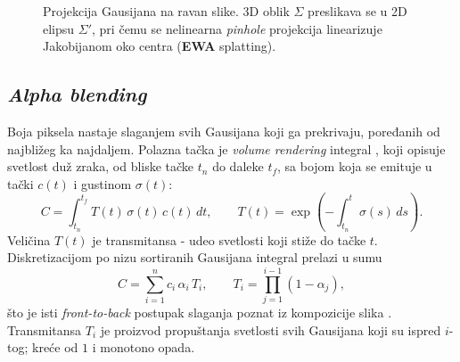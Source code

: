 \documentclass[12pt]{article}
\begin{document}
   \begin{figure}[H]
      \centering
      \vspace{1.2cm}
      \caption{Projekcija Gausijana na ravan slike. 3D oblik $\Sigma$ preslikava se
      u 2D elipsu $\Sigma'$, pri čemu se nelinearna \textit{pinhole} projekcija
      linearizuje Jakobijanom oko centra (\textbf{EWA} splatting).}
      \label{fig:proj}
   \end{figure}

   \newpage
   \subsection{\textit{Alpha blending}}

   Boja piksela nastaje slaganjem svih Gausijana koji ga prekrivaju, poređanih od
   najbližeg ka najdaljem. Polazna tačka je \textit{volume rendering} integral
   \cite{max_volume_rendering}, koji opisuje svetlost duž zraka, od bliske tačke
   $t_n$ do daleke $t_f$, sa bojom koja se emituje u tački $c(t)$ i gustinom $\sigma(t)$:
   \begin{equation}\label{eq:vri}
      C = \int_{t_n}^{t_f} T(t)\,\sigma(t)\,c(t)\,dt, \qquad
      T(t) = \exp\!\left(-\int_{t_n}^{t} \sigma(s)\,ds\right).
   \end{equation}
   Veličina $T(t)$ je transmitansa - udeo svetlosti koji stiže do
   tačke $t$. Diskretizacijom po nizu sortiranih Gausijana integral prelazi u sumu
   \begin{equation}\label{eq:discrete}
      C = \sum_{i=1}^{n} c_i\,\alpha_i\,T_i, \qquad T_i = \prod_{j=1}^{i-1}(1 - \alpha_j),
   \end{equation}
   što je isti \textit{front-to-back} postupak slaganja poznat iz kompozicije slika
   \cite{porter_duff}. Transmitansa $T_i$ je proizvod propuštanja svetlosti svih Gausijana
   koji su ispred $i$-tog; kreće od $1$ i monotono opada.
\end{document}
